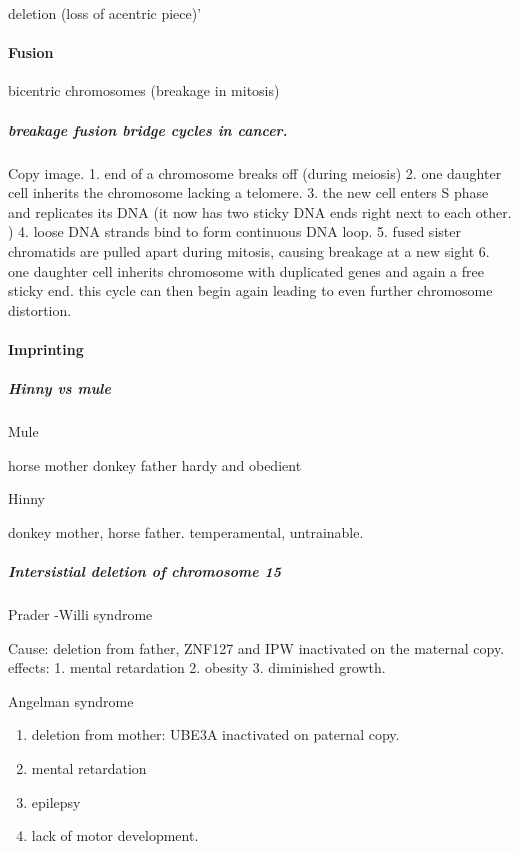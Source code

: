 \documentclass[]{article}
\providecommand{\tightlist}{%
  \setlength{\itemsep}{0pt}\setlength{\parskip}{0pt}}
\let\oldparagraph\paragraph
\renewcommand{\paragraph}[1]{\oldparagraph{#1}\mbox{}}
\let\oldsubparagraph\subparagraph
\renewcommand{\subparagraph}[1]{\oldsubparagraph{#1}\mbox{}}
\begin{document}
deletion (loss of acentric piece)'

\hypertarget{fusion-1}{%
\paragraph{Fusion}\label{fusion-1}}

bicentric chromosomes (breakage in mitosis)

\hypertarget{breakage-fusion-bridge-cycles-in-cancer.-1}{%
\subparagraph{breakage fusion bridge cycles in
cancer.}\label{breakage-fusion-bridge-cycles-in-cancer.-1}}

Copy image. 1. end of a chromosome breaks off (during meiosis) 2. one
daughter cell inherits the chromosome lacking a telomere. 3. the new
cell enters S phase and replicates its DNA (it now has two sticky DNA
ends right next to each other. ) 4. loose DNA strands bind to form
continuous DNA loop. 5. fused sister chromatids are pulled apart during
mitosis, causing breakage at a new sight 6. one daughter cell inherits
chromosome with duplicated genes and again a free sticky end. this cycle
can then begin again leading to even further chromosome distortion.

\hypertarget{imprinting-1}{%
\paragraph{Imprinting}\label{imprinting-1}}

\hypertarget{hinny-vs-mule-1}{%
\subparagraph{Hinny vs mule}\label{hinny-vs-mule-1}}

Mule

horse mother donkey father hardy and obedient

Hinny

donkey mother, horse father. temperamental, untrainable.

\hypertarget{intersistial-deletion-of-chromosome-15-1}{%
\subparagraph{Intersistial deletion of chromosome
15}\label{intersistial-deletion-of-chromosome-15-1}}

Prader -Willi syndrome

Cause: deletion from father, ZNF127 and IPW inactivated on the maternal
copy.\\
effects: 1. mental retardation 2. obesity 3. diminished growth.

Angelman syndrome

\begin{enumerate}
\def\labelenumi{\arabic{enumi}.}
\tightlist
\item
  deletion from mother: UBE3A inactivated on paternal copy.\\
\item
  mental retardation
\item
  epilepsy
\item
  lack of motor development.
\end{enumerate}
\end{document}
